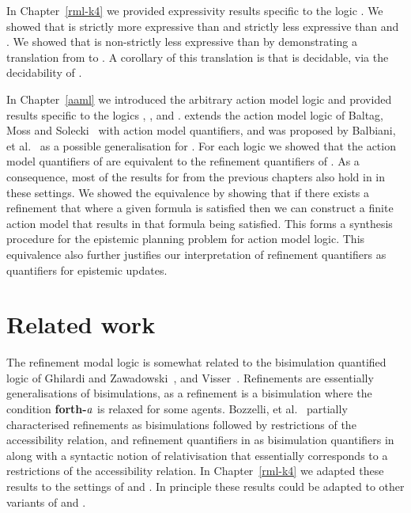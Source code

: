 In Chapter~\ref{rml-k4} we provided expressivity results specific to the logic \logicRmlKF{}.
We showed that \logicRmlKF{} is strictly more expressive than \logicKF{} and strictly less expressive than \logicMuKF{} and \logicBqmlKF{}.
We showed that \logicRmlKF{} is non-strictly less expressive than \logicBqmlKF{} by demonstrating a translation from \langRml{} to \langBqml{}.
A corollary of this translation is that \logicRmlKF{} is decidable, via the decidability of \logicBqmlKF{}.

In Chapter~\ref{aaml} we introduced the arbitrary action model logic and provided results specific to the logics \logicAamlK{}, \logicAamlKFF{}, and \logicAamlS{}.
\logicAaml{} extends the action model logic of Baltag, Moss and Solecki~\cite{baltag:1998,baltag:2004} with action model quantifiers, and was proposed by Balbiani, et al.~\cite{balbiani:2007} as a possible generalisation for \logicApal{}.
For each logic we showed that the action model quantifiers of \logicAaml{} are equivalent to the refinement quantifiers of \logicRml{}.
As a consequence, most of the results for \logicRml{} from the previous chapters also hold in \logicAaml{} in these settings.
We showed the equivalence by showing that if there exists a refinement that where a given formula is satisfied then we can construct a finite action model that results in that formula being satisfied.
This forms a synthesis procedure for the epistemic planning problem for action model logic.
This equivalence also further justifies our interpretation of refinement quantifiers as quantifiers for epistemic updates.

\section{Related work}

The refinement modal logic is somewhat related to the bisimulation quantified logic of Ghilardi and Zawadowski~\cite{ghilardi:2002}, and Visser~\cite{visser:1996}.
Refinements are essentially generalisations of bisimulations, as a refinement is a bisimulation where the condition {\bf forth-$a$} is relaxed for some agents.
Bozzelli, et al.~\cite{bozzelli:2014a} partially characterised refinements as bisimulations followed by restrictions of the accessibility relation, and refinement quantifiers in \logicRmlK{} as bisimulation quantifiers in \logicBqmlK{} along with a syntactic notion of relativisation that essentially corresponds to a restrictions of the accessibility relation.
In Chapter~\ref{rml-k4} we adapted these results to the settings of \logicRmlKF{} and \logicBqmlKF{}.
In principle these results could be adapted to other variants of \logicRml{} and \logicBqml{}.

